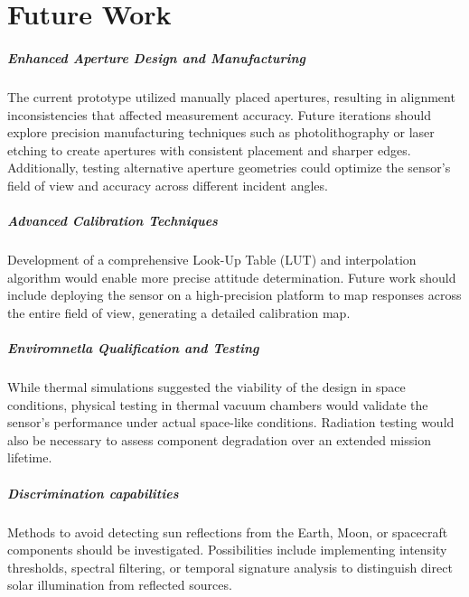 \chapter{Future Work}


\paragraph{Enhanced Aperture Design and Manufacturing}

The current prototype utilized manually placed apertures, resulting in alignment inconsistencies that affected measurement accuracy. 
Future iterations should explore precision manufacturing techniques such as photolithography or laser etching to create apertures with consistent placement and sharper edges. 
Additionally, testing alternative aperture geometries could optimize the sensor's field of view and accuracy across different incident angles.

\paragraph{Advanced Calibration Techniques}

Development of a comprehensive Look-Up Table (LUT) and interpolation algorithm would enable more precise attitude determination. 
Future work should include deploying the sensor on a high-precision platform to map responses across the entire field of view, generating a detailed calibration map.

\paragraph{Enviromnetla Qualification and Testing}

While thermal simulations suggested the viability of the design in space conditions, physical testing in thermal vacuum chambers would validate the sensor's performance under actual space-like conditions. 
Radiation testing would also be necessary to assess component degradation over an extended mission lifetime.

\paragraph{Discrimination capabilities}

Methods to avoid detecting sun reflections from the Earth, Moon, or spacecraft components should be investigated. 
Possibilities include implementing intensity thresholds, spectral filtering, or temporal signature analysis to distinguish direct solar illumination from reflected sources.